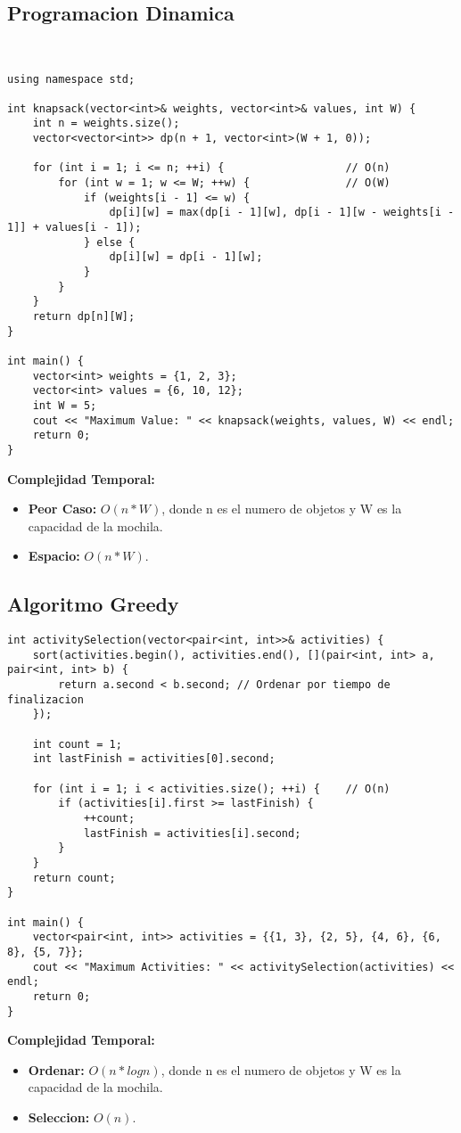 \subsection{Programacion Dinamica}
    \begin{lstlisting}[style=cpp]
   

using namespace std;

int knapsack(vector<int>& weights, vector<int>& values, int W) {
    int n = weights.size();
    vector<vector<int>> dp(n + 1, vector<int>(W + 1, 0));

    for (int i = 1; i <= n; ++i) {                   // O(n)
        for (int w = 1; w <= W; ++w) {               // O(W)
            if (weights[i - 1] <= w) {
                dp[i][w] = max(dp[i - 1][w], dp[i - 1][w - weights[i - 1]] + values[i - 1]);
            } else {
                dp[i][w] = dp[i - 1][w];
            }
        }
    }
    return dp[n][W];
}

int main() {
    vector<int> weights = {1, 2, 3};
    vector<int> values = {6, 10, 12};
    int W = 5;
    cout << "Maximum Value: " << knapsack(weights, values, W) << endl;
    return 0;
}

    \end{lstlisting}
    \textbf{Complejidad Temporal: }
    \begin{itemize}
        \item \textbf{Peor Caso: }$O(n *W)$, donde n es el numero de objetos y W es la capacidad de la mochila.
        \item \textbf{Espacio: }$O(n*W).$
    \end{itemize}

\subsection{Algoritmo Greedy}
    \begin{lstlisting}[style=cpp]
int activitySelection(vector<pair<int, int>>& activities) {
    sort(activities.begin(), activities.end(), [](pair<int, int> a, pair<int, int> b) {
        return a.second < b.second; // Ordenar por tiempo de finalizacion
    });

    int count = 1;
    int lastFinish = activities[0].second;

    for (int i = 1; i < activities.size(); ++i) {    // O(n)
        if (activities[i].first >= lastFinish) {
            ++count;
            lastFinish = activities[i].second;
        }
    }
    return count;
}

int main() {
    vector<pair<int, int>> activities = {{1, 3}, {2, 5}, {4, 6}, {6, 8}, {5, 7}};
    cout << "Maximum Activities: " << activitySelection(activities) << endl;
    return 0;
}
    \end{lstlisting}
    \textbf{Complejidad Temporal: }
    \begin{itemize}
        \item \textbf{Ordenar: }$O(n*logn)$, donde n es el numero de objetos y W es la capacidad de la mochila.
        \item \textbf{Seleccion: }$O(n).$
    \end{itemize}

